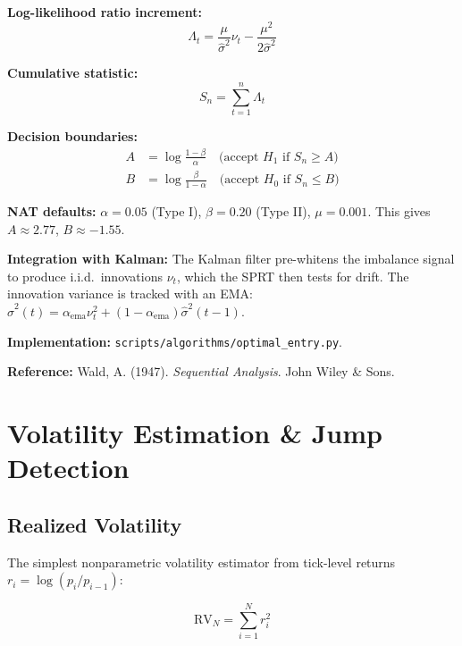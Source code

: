 \documentclass[11pt,a4paper]{article}
\begin{document}
\textbf{Log-likelihood ratio increment:}
\begin{equation}
\Lambda_t = \frac{\mu}{\hat{\sigma}^2} \nu_t - \frac{\mu^2}{2\hat{\sigma}^2}
\end{equation}

\textbf{Cumulative statistic:}
\begin{equation}
S_n = \sum_{t=1}^{n} \Lambda_t
\end{equation}

\textbf{Decision boundaries:}
\begin{align}
A &= \log\frac{1 - \beta}{\alpha} \quad \text{(accept $H_1$ if $S_n \geq A$)} \\
B &= \log\frac{\beta}{1 - \alpha} \quad \text{(accept $H_0$ if $S_n \leq B$)}
\end{align}

\textbf{NAT defaults:} $\alpha = 0.05$ (Type I), $\beta = 0.20$ (Type II), $\mu = 0.001$. This gives $A \approx 2.77$, $B \approx -1.55$.

\textbf{Integration with Kalman:} The Kalman filter pre-whitens the imbalance signal to produce i.i.d.\ innovations $\nu_t$, which the SPRT then tests for drift. The innovation variance is tracked with an EMA: $\hat{\sigma}^2(t) = \alpha_{\text{ema}} \nu_t^2 + (1 - \alpha_{\text{ema}}) \hat{\sigma}^2(t-1)$.

\textbf{Implementation:} \texttt{scripts/algorithms/optimal\_entry.py}.

\textbf{Reference:} Wald, A. (1947). \textit{Sequential Analysis}. John Wiley \& Sons.

\newpage
\section{Volatility Estimation \& Jump Detection}

\subsection{Realized Volatility}

The simplest nonparametric volatility estimator from tick-level returns $r_i = \log(p_i / p_{i-1})$:

\begin{equation}
\text{RV}_N = \sum_{i=1}^{N} r_i^2
\end{equation}
\end{document}
